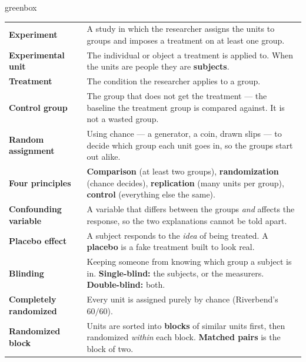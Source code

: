 \documentclass[10pt]{article}
\begin{document}
\boxguard[24]
\begin{skillbox}{greenbox}
\small
\renewcommand{\arraystretch}{1.35}
\begin{tabularx}{\linewidth}{@{} >{\bfseries}p{3.1cm} X @{}}
Experiment & A study in which the researcher assigns the units to groups and imposes a
       treatment on at least one group. \\
Experimental unit & The individual or object a treatment is applied to. When the units are
       people they are \textbf{subjects}. \\
Treatment & The condition the researcher applies to a group. \\
Control group & The group that does not get the treatment --- the baseline the treatment
       group is compared against. It is not a wasted group. \\
Random assignment & Using chance --- a generator, a coin, drawn slips --- to decide which
       group each unit goes in, so the groups start out alike. \\
Four principles & \textbf{Comparison} (at least two groups), \textbf{randomization} (chance
       decides), \textbf{replication} (many units per group), \textbf{control} (everything
       else the same). \\
Confounding variable & A variable that differs between the groups \emph{and} affects the
       response, so the two explanations cannot be told apart. \\
Placebo effect & A subject responds to the \emph{idea} of being treated. A \textbf{placebo}
       is a fake treatment built to look real. \\
Blinding & Keeping someone from knowing which group a subject is in.
       \textbf{Single-blind:} the subjects, or the measurers. \textbf{Double-blind:} both. \\
Completely randomized & Every unit is assigned purely by chance (Riverbend's $60/60$). \\
Randomized block & Units are sorted into \textbf{blocks} of similar units first, then
       randomized \emph{within} each block. \textbf{Matched pairs} is the block of two. \\
\end{tabularx}
\end{skillbox}
\end{document}

